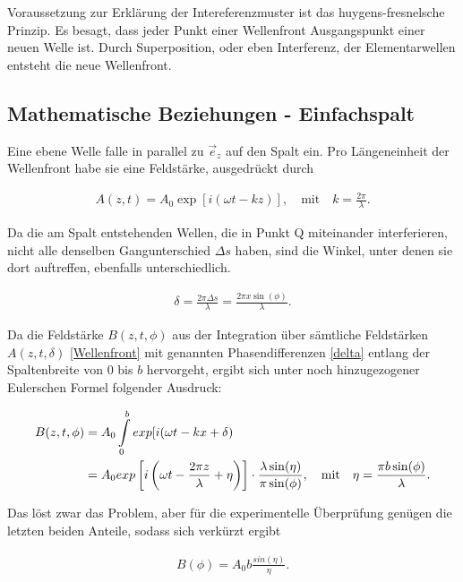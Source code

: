 Voraussetzung zur Erklärung der Intereferenzmuster ist das huygens-fresnelsche Prinzip. Es besagt, dass jeder Punkt einer
Wellenfront Ausgangspunkt einer neuen Welle ist. Durch Superposition, oder eben Interferenz, der Elementarwellen entsteht
die neue Wellenfront.

\subsection{Mathematische Beziehungen - Einfachspalt}
Eine ebene Welle falle in parallel zu $\vec{e}_z$ auf den Spalt ein. Pro Längeneinheit der Wellenfront habe sie eine Feldstärke,
ausgedrückt durch

\begin{align}
 A(z,t) = A_0 \exp[i(\omega t - kz)], \quad \text{mit} \quad  k =  \frac{2\pi}{\lambda}.
\label{Wellenfront} 
\end{align}

Da die am Spalt entstehenden Wellen, die in Punkt Q miteinander interferieren, nicht alle denselben Gangunterschied $\Delta s$ haben, 
sind die Winkel, unter denen sie dort auftreffen, ebenfalls unterschiedlich. 


\begin{align}
 \delta = \frac{2\pi \Delta s}{\lambda} = \frac{2\pi x \sin(\phi)}{\lambda}.
\label{delta} 
\end{align}

Da die Feldstärke $B(z,t,\phi)$ aus der Integration über sämtliche Feldstärken $A(z,t,\delta)$ \eqref{Wellenfront} mit genannten Phasendifferenzen \eqref{delta}
entlang der Spaltenbreite von 0 bis $b$ hervorgeht, ergibt sich unter noch hinzugezogener Eulerschen Formel folgender Ausdruck:

\begin{align*}
 B(z,t,\phi) & = A_0 \int\limits_0^b exp[i(\omega t - kx + \delta) \\
 & = A_0 exp \left[ i \left( \omega t - \frac{2\pi z}{\lambda} + \eta \right) \right] \cdot \frac{\lambda \sin(\eta)}{\pi \sin(\phi)}, \quad \text{mit} \quad \eta = \frac{\pi b \sin(\phi)}{\lambda}.
\notag
\end{align*}


Das löst zwar das Problem, aber für die experimentelle Überprüfung genügen die letzten beiden Anteile, sodass sich verkürzt ergibt


\begin{align}
 B(\phi) = A_0 b \frac{sin(\eta)}{\eta}.
\label{B}
\end{align}

